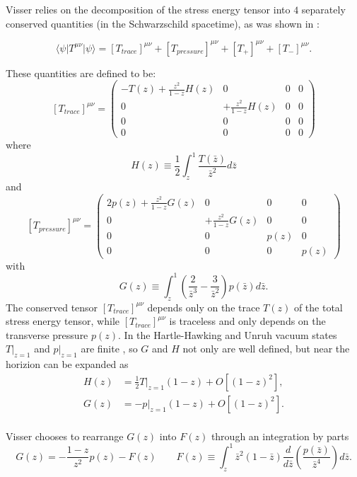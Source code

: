 Visser relies on the decomposition of the stress energy tensor into \(4\) separately conserved quantities (in the Schwarzschild spacetime), as was shown in \cite[]{christensen1977trace}:

\[
    \langle\psi\vert T^{\mu\nu}\vert\psi\rangle = \left[T_{trace}\right]^{\mu\nu} + \left[T_{pressure}\right]^{\mu\nu} +
    \left[T_{+}\right]^{\mu\nu} + \left[T_{-}\right]^{\mu\nu}.
\]

These quantities are defined to be:
\[
    \left[T_{trace}\right]^{\mu\nu} = \begin{pmatrix}
        -T(z) + \frac{z^2}{1 - z}H(z) & 0 & 0 & 0 \\
        0 & + \frac{z^2}{1 - z}H(z) & 0 & 0 \\
        0 & 0 & 0 & 0 \\
        0 & 0 & 0 & 0
    \end{pmatrix} 
\]
where 
\[
    H(z)\equiv \frac{1}{2}\int_{z}^{1} \frac{T(\bar{z})}{\bar{z}^2}d\bar{z}    
\]
and 
\[
    \left[T_{pressure}\right]^{\mu\nu} = 
    \begin{pmatrix}
        2p(z) + \frac{z^2}{1 - z}G(z) & 0 & 0 & 0 \\
        0 & + \frac{z^2}{1 - z}G(z) & 0 & 0 \\
        0 & 0 & p(z) & 0 \\
        0 & 0 & 0 & p(z)
    \end{pmatrix} 
\]
with 
\[
    \quad \quad G(z)\equiv \int_{z}^{1} \left(\frac{2}{\bar{z}^3} - \frac{3}{\bar{z}^2}\right)p(\bar{z})d\bar{z}.    
\]
The conserved tensor \(\left[T_{trace}\right]^{\mu\nu}\) depends only on the trace \(T(z)\) of the total stress energy tensor, while \(\left[T_{trace}\right]^{\mu\nu}\) is traceless and only depends on the transverse pressure \(p(z)\). In the Hartle-Hawking and Unruh vacuum states \(T\vert_{z = 1}\) and \(p\vert_{z = 1}\) are finite \cite[]{christensen1977trace,jensen1991renormalized}, so \(G\) and \(H\) not only are well defined, but near the horizion can be expanded as 
\begin{align*}
    H(z) &= \frac{1}{2}T\vert_{z = 1}(1 - z) + O[(1 - z)^2],\\
    G(z) &= -p\vert_{z = 1}(1 - z) + O[(1 - z)^2].\\
\end{align*}

Visser chooses to rearrange \(G(z)\) into \(F(z)\) through an integration by parts
\[
G(z) = - \frac{1 - z}{z^2}p(z) - F(z) \quad \quad F(z) \equiv \int_z^1 \bar{z}^2(1 - \bar{z})\frac{d}{d\bar{z}}\left(\frac{p(\bar{z})}{\bar{z}^4}\right) d\bar{z}.   
\]

